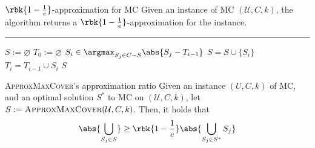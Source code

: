 \documentclass[a4paper, 12pt]{report}
\begin{document}
    \begin{framedalgo}{$\rbk{1 - \frac{1}{e}}$-approximation for MC}
        Given an instance of MC $(\mathcal U, C, k)$, the algorithm returns a $\rbk{1 - \tfrac{1}{e}}$-approximation for the instance. \\
        \hrule

        \quad
        \begin{algorithmic}[1]
                \State $S := \varnothing$
                \State $T_0 := \varnothing$
                    \State $\displaystyle S_i \in \argmax_{S_j \in C - S}{\abs{S_j - T_{i - 1}}}$ 
                    \State $S = S \cup \{S_i\}$
                    \State $T_i = T_{i - 1} \cup S_i$
                \EndFor
                \State {} $S$
            \EndFunction
        \end{algorithmic}
    \end{framedalgo}

    \begin{framedthm}[label={mc approx ratio}]{\textsc{ApproxMaxCover}'s approximation ratio}
        Given an instance $(U, C, k)$ of MC, and an optimal solution $S^*$ to MC on $(\mathcal U, C, k)$, let $S := \textsc{ApproxMaxCover}(\mathcal U, C, k)$. Then, it holds that $$\abs{\bigcup_{S_j \in S}} \ge \rbk{1 - \dfrac{1}{e}}\abs{\bigcup_{S_j \in S^*}{S_j}}$$
    \end{framedthm}
\end{document}
